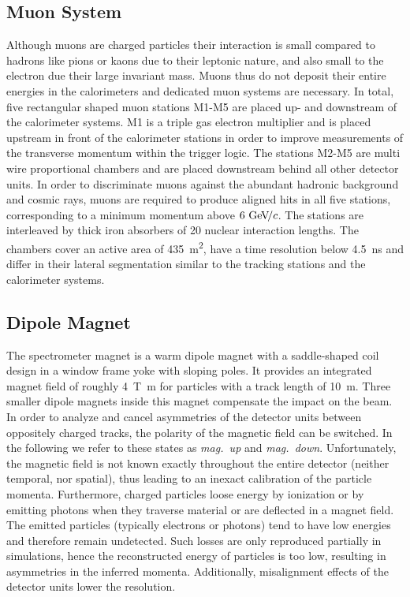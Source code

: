 \subsection{Muon System}
Although muons are charged particles their interaction is small compared to hadrons like pions or kaons due to their leptonic nature, and also small to the electron due their large invariant mass.
Muons thus do not deposit their entire energies in the calorimeters and dedicated muon systems are necessary.
In total, five rectangular shaped muon stations M1-M5 are placed up- and downstream of the calorimeter systems.
M1 is a triple gas electron multiplier and is placed upstream in front of the calorimeter stations in order to improve measurements of the transverse momentum within the trigger logic.
The stations M2-M5 are multi wire proportional chambers and are placed downstream behind all other detector units.
In order to discriminate muons against the abundant hadronic background and cosmic rays, muons are required to produce aligned hits in all five stations, corresponding to a minimum momentum above $6\,{\mathrm{\,Ge\kern -0.1em V\!/}c}$.
The stations are interleaved by thick iron absorbers of 20 nuclear interaction lengths.
The chambers cover an active area of \SI{435}{\meter\squared}, have a time resolution below \SI{4.5}{\nano\second} and differ in their lateral segmentation similar to the tracking stations and the calorimeter systems.

\subsection{Dipole Magnet}
The spectrometer magnet is a warm dipole magnet with a saddle-shaped coil design in a window frame yoke with sloping poles.
It provides an integrated magnet field of roughly \SI{4}{\tesla\meter} for particles with a track length of \SI{10}{\meter}.
Three smaller dipole magnets inside this magnet compensate the impact on the \lhc beam.
In order to analyze and cancel asymmetries of the detector units between oppositely charged tracks, the polarity of the magnetic field can be switched.
In the following we refer to these states as \textit{mag.\ up} and \textit{mag.\ down}.
Unfortunately, the magnetic field is not known exactly throughout the entire detector (neither temporal, nor spatial), thus leading to an inexact calibration of the particle momenta.
Furthermore, charged particles loose energy by ionization or by emitting photons when they traverse material or are deflected in a magnet field.
The emitted particles (typically electrons or photons) tend to have low energies and therefore remain undetected.
Such losses are only reproduced partially in simulations, hence the reconstructed energy of particles is too low, resulting in asymmetries in the inferred momenta.
Additionally, misalignment effects of the detector units lower the resolution.

